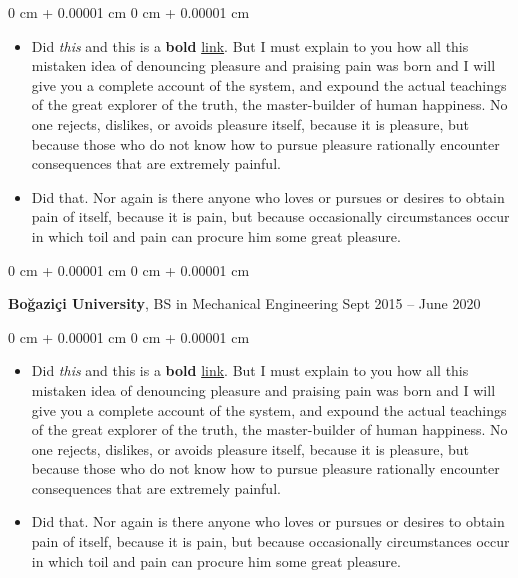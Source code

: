 \documentclass[10pt, letterpaper]{article}
\newenvironment{highlights}{
    \begin{itemize}[
        topsep=0.10 cm,
        parsep=0.10 cm,
        partopsep=0pt,
        itemsep=0pt,
        leftmargin=0 cm + 10pt
    ]
}{
    \end{itemize}
} %
\newenvironment{onecolentry}{
    \begin{adjustwidth}{
        0 cm + 0.00001 cm
    }{
        0 cm + 0.00001 cm
    }
}{
    \end{adjustwidth}
} %
\newenvironment{twocolentry}[2][]{
    \onecolentry
    \def\secondColumn{#2}
    \setcolumnwidth{\fill, 4.5 cm}
    \begin{paracol}{2}
}{
    \switchcolumn \raggedleft \secondColumn
    \end{paracol}
    \endonecolentry
} %
\begin{document}
        \vspace{0.10 cm}
        \begin{onecolentry}
            \begin{highlights}
                \item Did \textit{this} and this is a \textbf{bold} \href{https://example.com}{link}. But I must explain to you how all this mistaken idea of denouncing pleasure and praising pain was born and I will give you a complete account of the system, and expound the actual teachings of the great explorer of the truth, the master-builder of human happiness. No one rejects, dislikes, or avoids pleasure itself, because it is pleasure, but because those who do not know how to pursue pleasure rationally encounter consequences that are extremely painful.
                \item Did that. Nor again is there anyone who loves or pursues or desires to obtain pain of itself, because it is pain, but because occasionally circumstances occur in which toil and pain can procure him some great pleasure.
            \end{highlights}
        \end{onecolentry}


        \vspace{0.2 cm}

        \begin{twocolentry}{
            Sept 2015 – June 2020
        }
            \textbf{Boğaziçi University}, BS in Mechanical Engineering\end{twocolentry}

        \vspace{0.10 cm}
        \begin{onecolentry}
            \begin{highlights}
                \item Did \textit{this} and this is a \textbf{bold} \href{https://example.com}{link}. But I must explain to you how all this mistaken idea of denouncing pleasure and praising pain was born and I will give you a complete account of the system, and expound the actual teachings of the great explorer of the truth, the master-builder of human happiness. No one rejects, dislikes, or avoids pleasure itself, because it is pleasure, but because those who do not know how to pursue pleasure rationally encounter consequences that are extremely painful.
                \item Did that. Nor again is there anyone who loves or pursues or desires to obtain pain of itself, because it is pain, but because occasionally circumstances occur in which toil and pain can procure him some great pleasure.
            \end{highlights}
        \end{onecolentry}
\end{document}
